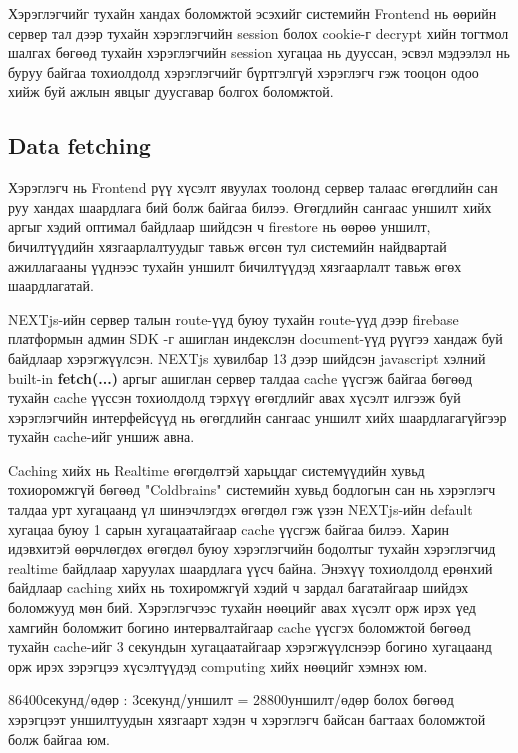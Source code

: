 Хэрэглэгчийг тухайн хандах боломжтой эсэхийг системийн Frontend нь өөрийн сервер тал дээр тухайн хэрэглэгчийн session болох cookie-г decrypt хийн тогтмол шалгах бөгөөд тухайн хэрэглэгчийн session хугацаа нь дууссан, эсвэл мэдээлэл нь буруу байгаа тохиолдолд хэрэглэгчийг бүртгэлгүй хэрэглэгч гэж тооцон одоо хийж буй ажлын явцыг дуусгавар болгох боломжтой.

\subsection{Data fetching}
Хэрэглэгч нь Frontend рүү хүсэлт явуулах тоолонд сервер талаас өгөгдлийн сан руу хандах шаардлага бий болж байгаа билээ. Өгөгдлийн сангаас уншилт хийх аргыг хэдий оптимал байдлаар шийдсэн ч firestore нь өөрөө уншилт, бичилтүүдийн хязгаарлалтуудыг тавьж өгсөн тул системийн найдвартай ажиллагааны үүднээс тухайн уншилт бичилтүүдэд хязгаарлалт тавьж өгөх шаардлагатай. 

NEXTjs-ийн сервер талын route-үүд буюу тухайн route-үүд дээр firebase платформын админ SDK\footnotemark{} -г ашиглан индекслэн document-үүд рүүгээ хандаж буй байдлаар хэрэгжүүлсэн. NEXTjs хувилбар 13 дээр шийдсэн javascript хэлний built-in \textbf{fetch(...)}\cite{NEXTcache} аргыг ашиглан сервер талдаа cache үүсгэж байгаа бөгөөд тухайн cache үүссэн тохиолдолд тэрхүү өгөгдлийг авах хүсэлт илгээж буй хэрэглэгчийн интерфейсүүд нь өгөгдлийн сангаас уншилт хийх шаардлагагүйгээр тухайн cache-ийг уншиж авна. 

Caching хийх нь Realtime өгөгдөлтэй харьцдаг системүүдийн хувьд тохиоромжгүй бөгөөд "Coldbrains" системийн хувьд бодлогын сан нь хэрэглэгч талдаа урт хугацаанд үл шинэчлэгдэх өгөгдөл гэж үзэн NEXTjs-ийн default хугацаа буюу 1 сарын хугацаатайгаар cache үүсгэж байгаа билээ. Харин идэвхитэй өөрчлөгдөх өгөгдөл буюу хэрэглэгчийн бодолтыг тухайн хэрэглэгчид realtime байдлаар харуулах шаардлага үүсч байна. Энэхүү тохиолдолд ерөнхий байдлаар caching хийх нь тохиромжгүй хэдий ч зардал багатайгаар шийдэх боломжууд мөн бий. Хэрэглэгчээс тухайн нөөцийг авах хүсэлт орж ирэх үед хамгийн боломжит богино интервалтайгаар cache үүсгэх боломжтой бөгөөд тухайн cache-ийг 3 секундын хугацаатайгаар хэрэгжүүлснээр богино хугацаанд орж ирэх зэрэгцээ хүсэлтүүдэд computing\footnotemark{}  хийх нөөцийг хэмнэх юм. 

86400секунд/өдөр : 3секунд/уншилт = 28800уншилт/өдөр болох бөгөөд хэрэгцээт уншилтуудын хязгаарт хэдэн ч хэрэглэгч байсан багтаах боломжтой болж байгаа юм.

